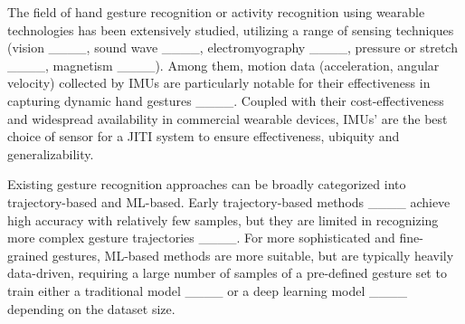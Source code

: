 
The field of hand gesture recognition or activity recognition using wearable technologies has been extensively studied, utilizing a range of sensing techniques (\eg vision ____, sound wave ____, electromyography ____, pressure or stretch ____, magnetism ____). 
Among them, motion data (\eg acceleration, angular velocity) collected by IMUs are particularly notable for their effectiveness in capturing dynamic hand gestures ____. Coupled with their cost-effectiveness and widespread availability in commercial wearable devices, IMUs' are the best choice of sensor for a JITI system to ensure effectiveness, ubiquity and generalizability.

Existing gesture recognition approaches can be broadly categorized into trajectory-based and ML-based. 
Early trajectory-based methods ____ achieve high accuracy with relatively few samples, but they are limited in recognizing more complex gesture trajectories ____. 
For more sophisticated and fine-grained gestures, ML-based methods are more suitable, but are typically heavily data-driven, requiring a large number of samples of a pre-defined gesture set to train either a traditional model ____ or a deep learning model ____ depending on the dataset size. 

